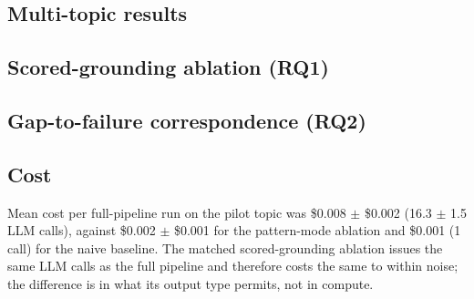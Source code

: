 \documentclass[11pt]{article}
\begin{document}
\subsection{Multi-topic results}
\label{sec:multitopic}


\subsection{Scored-grounding ablation (RQ1)}
\label{sec:scoredablation}


\subsection{Gap-to-failure correspondence (RQ2)}
\label{sec:gaptofailure}


\subsection{Cost}

Mean cost per full-pipeline run on the pilot topic was \$0.008 $\pm$ \$0.002
(16.3 $\pm$ 1.5 LLM calls), against \$0.002 $\pm$ \$0.001 for the pattern-mode
ablation and \$0.001 (1 call) for the naive baseline. The matched
scored-grounding ablation issues the same LLM calls as the full pipeline and
therefore costs the same to within noise; the difference is in what its output
type permits, not in compute. %
\end{document}
